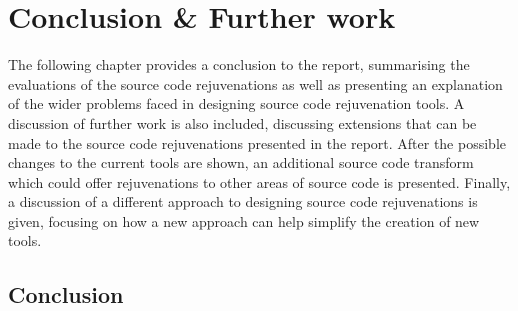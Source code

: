 \documentclass[bsc,frontabs,singlespacing,twoside,parskip,deptreport]{infthesis}
\begin{document}








\chapter{Conclusion \& Further work}
The following chapter provides a conclusion to the report, summarising the evaluations of the source code rejuvenations as well as presenting an explanation of the wider problems faced in designing source code rejuvenation tools. A discussion of further work is also included, discussing extensions that can be made to the source code rejuvenations presented in the report. After the possible changes to the current tools are shown, an additional source code transform which could offer rejuvenations to other areas of source code is presented. Finally, a discussion of a different approach to designing source code rejuvenations is given, focusing on how a new approach can help simplify the creation of new tools. 

\section{Conclusion}
\end{document}
